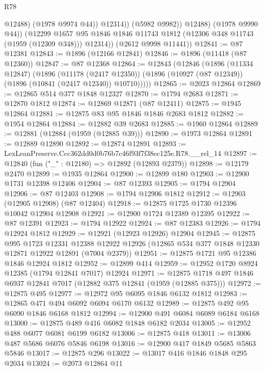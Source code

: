 \begin{lexlean}{R78}
\begin{coremodule}
                      @12488)
                    (@1978 @9974 @44))
                  @12314))
              (@5982 @9982))
            @12488)
          (@1978 @9990 @44))
        (@12299
          @1657
          @95
          @1846
          @1846
          @11743
          @1812
          (@12306 @348 @11743 (@1959 (@12309 @348)))
          @12314))
      (@2612 @9998 @11441))
@12841 := @87 @12381
@12843 := @1896 (@12166 @12841)
@12846 := @1896 (@11418 (@87 @12360))
@12847 := @87 @12368
@12864 := @12843
    (@12846
      (@1896
        (@11334 @12847)
        (@1896
          (@11178 (@2417 @12350))
          (@1896 (@10927 (@87 @12349)) (@1896 (@10841 (@2417 @12340)) @10710)))))
@12865 := @2023 @12864
@12869 := @12865 @514 @377 @1848 @12327
@12870 := @1794 @2683
@12871 := @12870 @1812
@12874 := @12869 @12871 (@87 @12411)
@12875 := @1945 @12864
@12881 := @12875 @83 @95 @1846 @1846 @2683 @1812
@12882 := @1954 @12864
@12884 := @12882 @39 @2683
@12885 := @1960 @12864
@12889 := @12881 (@12884 (@1959 (@12885 @39)))
@12890 := @1973 @12864
@12891 := @12889 @12890
@12892 := @12874 @12891
@12893 := LexLeanPreserve.Ccc362dd0d0b76b7c46f93f7f38ec125e.R78.__rel_14
@12897 := @12840 (fun ("_" : @12180) => @12892 (@12893 @2379))
@12898 := @12179 @2470
@12899 := @1935 @12864
@12900 := @12899 @180
@12903 := @12900 @1731 @12398 @12406
@12904 := @87 @12393
@12905 := @1794 @12904
@12906 := @87 @12403
@12908 := @1794 @12906 @1812
@12912 := @12903 (@12905 @12908) (@87 @12404)
@12918 := @12875 @1725 @1730 @12396 @10042 @12904 @12908
@12921 := @12900 @1724 @12389 @12395
@12922 := @87 @12391
@12923 := @1794 @12922
@12924 := @87 @12383
@12926 := @1794 @12924 @1812
@12929 := @12921 (@12923 @12926) @12904
@12945 := @12875
    @995
    @1723
    @12331
    @12388
    @12922
    @12926
    (@12865 @534 @377 @1848 @12330 @12871 @12922 @12891 (@7004 @2379))
@12951 := @12875 @1721 @95 @12386 @1846 @12924 @1812
@12952 := @12899 @414
@12959 := @12952 @1720 @8924 @12385 (@1794 @12841 @7017) @12924
@12971 := @12875 @1718 @497 @1846 @6937 @12841 @7017 (@12882 @375 @12841 (@1959 (@12885 @375)))
@12972 := @12875 @495
@12977 := @12972 @95 @6095 @1846 @6132 @1812
@12983 := @12865 @471 @494 @6092 @6094 @6170 @6132
@12989 := @12875 @492 @95 @6090 @1846 @6168 @1812
@12994 := @12900 @491 @6084 @6089 @6184 @6168
@13000 := @12875 @489 @416 @6082 @1848 @6182 @2034
@13005 := @12952 @488 @6077 @6081 @6199 @6182
@13006 := @12875 @418
@13011 := @13006 @487 @5686 @6076 @5846 @6198
@13016 := @12900 @417 @1849 @5685 @5863 @5846
@13017 := @12875 @296
@13022 := @13017 @416 @1846 @1848 @295 @2034
@13024 := @2073 @12864 @11

\end{coremodule}
\end{lexlean}
